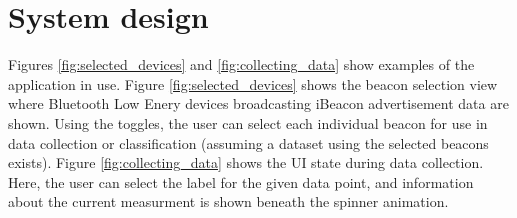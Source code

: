 \chapter{System design}




Figures \ref{fig:selected_devices} and \ref{fig:collecting_data} show examples of the application in use. 
Figure \ref{fig:selected_devices} shows the beacon selection view where Bluetooth Low Enery devices broadcasting iBeacon advertisement data are shown.
Using the toggles, the user can select each individual beacon for use in data collection or classification (assuming a dataset using the selected beacons exists).
Figure \ref{fig:collecting_data} shows the UI state during data collection.
Here, the user can select the label for the given data point, and information about the current measurment is shown beneath the spinner animation.

